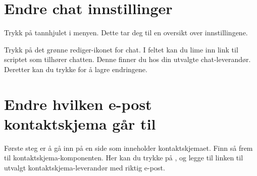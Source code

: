 \section{Endre chat innstillinger}

Trykk på tannhjulet i menyen. Dette tar deg til en oversikt over innstillingene. 

\begin{figure}[H]
    \centering
    \label{fig:cms-settings}
\end{figure}

Trykk på det grønne rediger-ikonet for chat. I feltet  kan du lime inn link til scriptet som tilhører chatten. Denne finner du hos din utvalgte chat-leverandør. Deretter kan du trykke  for å lagre endringene.

\begin{figure}[H]
    \centering
    \label{fig:cms-chat}
\end{figure}

\section{Endre hvilken e-post kontaktskjema går til}
Første steg er å gå inn på en side som inneholder kontaktskjemaet. Finn så frem til kontaktskjema-komponenten. Her kan du trykke på , og legge til linken til utvalgt kontaktskjema-leverandør med riktig e-post. 

